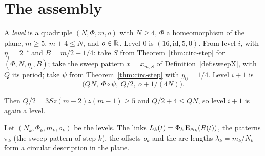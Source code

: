 
\section{The assembly}

\begin{definition}\label{def:levels}
A \emph{level} is a quadruple $(N,\Phi,m,o)$ with $N\ge4$, $\Phi$ a homeomorphism of the plane, $m\ge5$, $m+4\le N$, and $o\in\mathbb{R}$. Level $0$ is $(16,\mathrm{id},5,0)$. From level $i$, with
$\eta_i=2^{-i}$ and $B=m/2-1/4$: take $S$ from Theorem~\ref{thm:circ-step} for $(\Phi,N,\eta_i,B)$; take the sweep pattern $x=x_{m,S}$ of Definition~\ref{def:sweepX}, with $Q$ its
period; take $\psi$ from Theorem~\ref{thm:circ-step} with $y_0=1/4$. Level $i+1$ is
\[
\bigl(QN,\ \Phi\circ\psi,\ Q/2,\ o+1/(4N)\bigr).
\]
\end{definition}

Then $Q/2=3Sz(m-2)z(m-1)\ge5$ and $Q/2+4\le QN$, so level $i+1$ is again a level.


\begin{theorem}\label{thm:circdescr-plane}
Let $(N_k,\Phi_k,m_k,o_k)$ be the levels. The links $L_k(t)=\Phi_k\operatorname{E}_{N_k}(R(t))$, the patterns $\pi_k$ (the sweep pattern of step $k$), the offsets $o_k$ and the arc lengths
$\lambda_k=m_k/N_k$ form a circular description in the plane.
\end{theorem}

